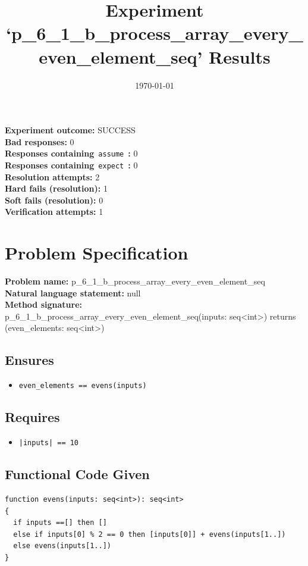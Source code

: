 \documentclass{article}
\begin{document}
\title{Experiment `p\_6\_1\_b\_process\_array\_every\_even\_element\_seq' Results}
\author{\today}
\date{}
\maketitle
\textbf{Experiment outcome: }SUCCESS
\\\textbf{Bad responses: }0
\\\textbf{Responses containing}~\texttt{assume}~\textbf{: }0
\\\textbf{Responses containing}~\texttt{expect}~\textbf{: }0
\\\textbf{Resolution attempts: }2
\\\textbf{Hard fails (resolution): }1
\\\textbf{Soft fails (resolution): }0
\\\textbf{Verification attempts: }1
\section*{Problem Specification}
\textbf{Problem name: }p\_6\_1\_b\_process\_array\_every\_even\_element\_seq
\\\textbf{Natural language statement: }null
\\\textbf{Method signature: }p\_6\_1\_b\_process\_array\_every\_even\_element\_seq(inputs: seq<int>) returns (even\_elements: seq<int>)
\subsection*{Ensures}
\begin{itemize}
\item \texttt{even\_elements == evens(inputs)}
\end{itemize}
\subsection*{Requires}
\begin{itemize}
\item \texttt{|inputs| == 10}
\end{itemize}
\subsection*{Functional Code Given}
\begin{lstlisting}
function evens(inputs: seq<int>): seq<int>
{
  if inputs ==[] then []
  else if inputs[0] % 2 == 0 then [inputs[0]] + evens(inputs[1..])
  else evens(inputs[1..])
}
\end{lstlisting}
\clearpage
\end{document}
